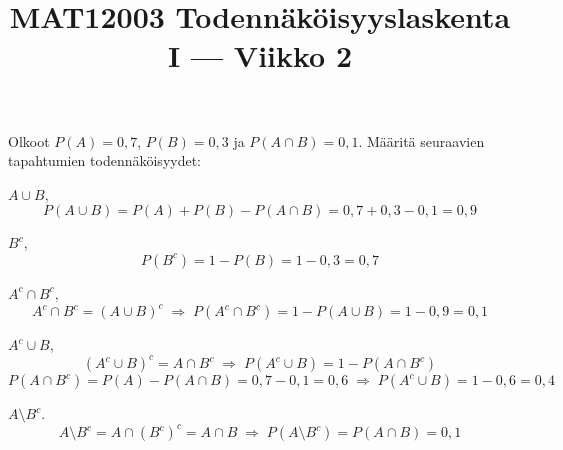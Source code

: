 \documentclass[12pt,a4paper]{article}
\title{MAT12003 Todennäköisyyslaskenta I — Viikko 2}
\date{}
\begin{document}
\maketitle

Olkoot $P(A)=0{,}7$, $P(B)=0{,}3$ ja $P(A\cap B)=0{,}1$.
Määritä seuraavien tapahtumien todennäköisyydet: 

\begin{kohta}
  \item $A\cup B$,
  \[
  P(A\cup B)=P(A)+P(B)-P(A\cap B)=0{,}7+0{,}3-0{,}1=0{,}9
  \]

  \item $B^c$,
  \[
  P(B^c)=1-P(B)=1-0{,}3=0{,}7
  \]

  \item $A^c\cap B^c$,
  \[
  A^c\cap B^c=(A\cup B)^c \;\Rightarrow\; P(A^c\cap B^c)=1-P(A\cup B)=1-0{,}9=0{,}1
  \]

  \item $A^c\cup B$,
  \[
  (A^c\cup B)^c=A\cap B^c \;\Rightarrow\; P(A^c\cup B)=1-P(A\cap B^c)
  \]
  \[
  P(A\cap B^c)=P(A)-P(A\cap B)=0{,}7-0{,}1=0{,}6 \;\Rightarrow\; P(A^c\cup B)=1-0{,}6=0{,}4
  \]

  \item $A\setminus B^c$.
  \[
  A\setminus B^c = A\cap (B^c)^c = A\cap B \;\Rightarrow\; P(A\setminus B^c)=P(A\cap B)=0{,}1
  \]
\end{kohta}
\end{document}
